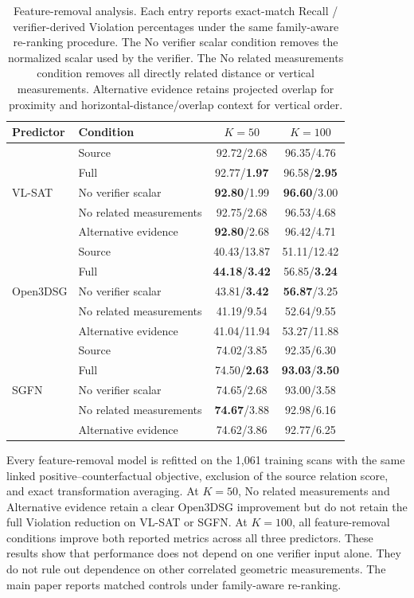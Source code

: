 \begin{table}[t]
\centering
{\small
\setlength{\tabcolsep}{2pt}
\begin{tabularx}{\linewidth}{@{}l>{\raggedright\arraybackslash}Xcc@{}}
\toprule
Predictor & Condition & $K=50$ & $K=100$ \\
\midrule
\multirow{5}{*}{VL-SAT}
 & Source & 92.72/2.68 & 96.35/4.76 \\
 & Full & 92.77/\textbf{1.97} & 96.58/\textbf{2.95} \\
 & No verifier scalar & \textbf{92.80}/1.99 & \textbf{96.60}/3.00 \\
 & No related measurements & 92.75/2.68 & 96.53/4.68 \\
 & Alternative evidence & \textbf{92.80}/2.68 & 96.42/4.71 \\
\midrule
\multirow{5}{*}{Open3DSG}
 & Source & 40.43/13.87 & 51.11/12.42 \\
 & Full & \textbf{44.18}/\textbf{3.42} & 56.85/\textbf{3.24} \\
 & No verifier scalar & 43.81/\textbf{3.42} & \textbf{56.87}/3.25 \\
 & No related measurements & 41.19/9.54 & 52.64/9.55 \\
 & Alternative evidence & 41.04/11.94 & 53.27/11.88 \\
\midrule
\multirow{5}{*}{SGFN}
 & Source & 74.02/3.85 & 92.35/6.30 \\
 & Full & 74.50/\textbf{2.63} & \textbf{93.03}/\textbf{3.50} \\
 & No verifier scalar & 74.65/2.68 & 93.00/3.58 \\
 & No related measurements & \textbf{74.67}/3.88 & 92.98/6.16 \\
 & Alternative evidence & 74.62/3.86 & 92.77/6.25 \\
\bottomrule
\end{tabularx}
}
\caption{Feature-removal analysis. Each entry reports exact-match Recall / verifier-derived Violation percentages under the same family-aware re-ranking procedure. The No verifier scalar condition removes the normalized scalar used by the verifier. The No related measurements condition removes all directly related distance or vertical measurements. Alternative evidence retains projected overlap for proximity and horizontal-distance/overlap context for vertical order.}
\label{tab:primitive-holdout}
\end{table}

Every feature-removal model is refitted on the 1,061 training scans with the same linked positive--counterfactual objective, exclusion of the source relation score,
and exact transformation averaging. At $K=50$, No related measurements and Alternative evidence retain a clear Open3DSG improvement but do not retain the full Violation reduction on VL-SAT or SGFN. At $K=100$, all feature-removal conditions improve both reported metrics across all three predictors. These results show that performance does not depend on one verifier input alone. They do not rule out dependence on other correlated geometric measurements. The main paper reports matched controls under family-aware re-ranking.

